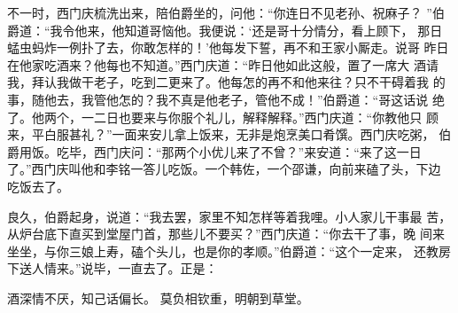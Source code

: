 不一时，西门庆梳洗出来，陪伯爵坐的，问他：“你连日不见老孙、祝麻子？
”伯爵道：“我令他来，他知道哥恼他。我便说：‘还是哥十分情分，看上顾下，
那日蜢虫蚂炸一例扑了去，你敢怎样的！’他每发下誓，再不和王家小厮走。说哥
昨日在他家吃酒来？他每也不知道。”西门庆道：“昨日他如此这般，置了一席大
酒请我，拜认我做干老子，吃到二更来了。他每怎的再不和他来往？只不干碍着我
的事，随他去，我管他怎的？我不真是他老子，管他不成！”伯爵道：“哥这话说
绝了。他两个，一二日也要来与你服个礼儿，解释解释。”西门庆道：“你教他只
顾来，平白服甚礼？”一面来安儿拿上饭来，无非是炮烹美口肴馔。西门庆吃粥，
伯爵用饭。吃毕，西门庆问：“那两个小优儿来了不曾？”来安道：“来了这一日
了。”西门庆叫他和李铭一答儿吃饭。一个韩佐，一个邵谦，向前来磕了头，下边
吃饭去了。

良久，伯爵起身，说道：“我去罢，家里不知怎样等着我哩。小人家儿干事最
苦，从炉台底下直买到堂屋门首，那些儿不要买？”西门庆道：“你去干了事，晚
间来坐坐，与你三娘上寿，磕个头儿，也是你的孝顺。”伯爵道：“这个一定来，
还教房下送人情来。”说毕，一直去了。正是：

酒深情不厌，知己话偏长。
莫负相钦重，明朝到草堂。